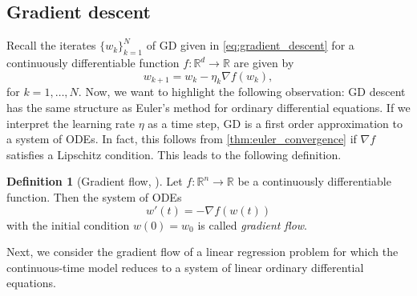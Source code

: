 \documentclass[12pt]{article}
\theoremstyle{definition}
\newtheorem{definition}[definition]{Definition}
\numberwithin{equation}{section}
\newcommand{\R}{\mathbb{R}}
\begin{document}
\subsection{Gradient descent}
\label{sec:gradient_flow}
Recall the iterates $\{ w_k\}_{k=1}^N$ of GD given in \eqref{eq:gradient_descent} for a continuously differentiable function $f : \R^d \rightarrow \R$ are given by
\begin{equation*}
  w_{k+1} = w_{k} - \eta_k \nabla f(w_{k}),
\end{equation*}
for $k=1,\dots,N$. Now, we want to highlight the following observation: GD descent has the same structure as Euler's method for ordinary differential equations. If we interpret the learning rate $\eta$ as a time step, GD is a first order approximation to a system of ODEs. In fact, this follows from \autoref{thm:euler_convergence} if $\nabla f$ satisfies a Lipschitz condition. This leads to the following definition.
\begin{definition}[Gradient flow, ]
  Let $f : \R^n \rightarrow \R$ be a continuously differentiable function. Then the system of ODEs
  \begin{equation}
  w'(t) = - \nabla f(w(t))
  \end{equation}
  with the initial condition $w(0) = w_{0}$ is called \emph{gradient flow}.
\end{definition}
Next, we consider the gradient flow of a linear regression problem for which the continuous-time model reduces to a system of linear ordinary differential equations.
\end{document}
